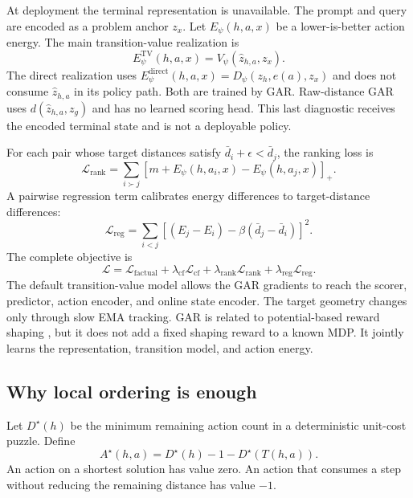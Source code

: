 At deployment the terminal representation is unavailable. The prompt and query are encoded as a problem anchor $z_x$. Let $E_\psi(h,a,x)$ be a lower-is-better action energy. The main transition-value realization is
\begin{equation}
    E^{\mathrm{TV}}_\psi(h,a,x)
    =V_\psi(\widehat z_{h,a},z_x).
\end{equation}
The direct realization uses $E^{\mathrm{direct}}_\psi(h,a,x)=D_\psi(z_h,e(a),z_x)$ and does not consume $\widehat z_{h,a}$ in its policy path. Both are trained by GAR. Raw-distance GAR uses $d(\widehat z_{h,a},z_g)$ and has no learned scoring head. This last diagnostic receives the encoded terminal state and is not a deployable policy.

For each pair whose target distances satisfy $\bar d_i+\epsilon<\bar d_j$, the ranking loss is
\begin{equation}
    \mathcal{L}_{\mathrm{rank}}
    =\sum_{i\succ j}\left[m+E_\psi(h,a_i,x)-E_\psi(h,a_j,x)\right]_+.
\end{equation}
A pairwise regression term calibrates energy differences to target-distance differences:
\begin{equation}
    \mathcal{L}_{\mathrm{reg}}
    =\sum_{i<j}\left[(E_j-E_i)-\beta(\bar d_j-\bar d_i)\right]^2.
\end{equation}
The complete objective is
\begin{equation}
    \mathcal{L}=\mathcal{L}_{\mathrm{factual}}
    +\lambda_{\mathrm{cf}}\mathcal{L}_{\mathrm{cf}}
    +\lambda_{\mathrm{rank}}\mathcal{L}_{\mathrm{rank}}
    +\lambda_{\mathrm{reg}}\mathcal{L}_{\mathrm{reg}}.
\end{equation}
The default transition-value model allows the GAR gradients to reach the scorer, predictor, action encoder, and online state encoder. The target geometry changes only through slow EMA tracking. GAR is related to potential-based reward shaping \citep{ng1999policy}, but it does not add a fixed shaping reward to a known MDP. It jointly learns the representation, transition model, and action energy.

\subsection{Why local ordering is enough}

Let $D^\star(h)$ be the minimum remaining action count in a deterministic unit-cost puzzle. Define
\begin{equation}
    A^\star(h,a)=D^\star(h)-1-D^\star(T(h,a)).
\end{equation}
An action on a shortest solution has value zero. An action that consumes a step without reducing the remaining distance has value $-1$.

